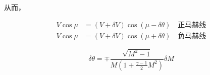 从而，

\begin{align*}
    V \cos \mu&=(V+\delta V) \cos (\mu-\delta \theta)\quad\mbox{正马赫线}\\ 
    V \cos \mu&=(V+\delta V) \cos (\mu+\delta \theta)\quad\mbox{负马赫线}
\end{align*}

\begin{equation*}
    \delta \theta=\mp \frac{\sqrt{M^{2}-1}}{M\left(1+\frac{\gamma-1}{2} M^{2}\right)} \delta M
\end{equation*}